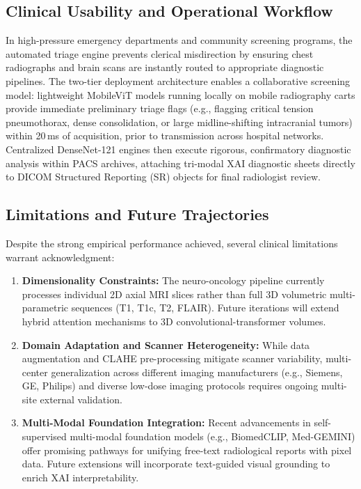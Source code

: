 \documentclass[journal]{IEEEtran}
\begin{document}
\subsection{Clinical Usability and Operational Workflow}
In high-pressure emergency departments and community screening programs, the automated triage engine prevents clerical misdirection by ensuring chest radiographs and brain scans are instantly routed to appropriate diagnostic pipelines. The two-tier deployment architecture enables a collaborative screening model: lightweight MobileViT models running locally on mobile radiography carts provide immediate preliminary triage flags (e.g., flagging critical tension pneumothorax, dense consolidation, or large midline-shifting intracranial tumors) within 20\,ms of acquisition, prior to transmission across hospital networks. Centralized DenseNet-121 engines then execute rigorous, confirmatory diagnostic analysis within PACS archives, attaching tri-modal XAI diagnostic sheets directly to DICOM Structured Reporting (SR) objects for final radiologist review.

\subsection{Limitations and Future Trajectories}
Despite the strong empirical performance achieved, several clinical limitations warrant acknowledgment:
\begin{enumerate}
    \item \textbf{Dimensionality Constraints:} The neuro-oncology pipeline currently processes individual 2D axial MRI slices rather than full 3D volumetric multi-parametric sequences (T1, T1c, T2, FLAIR). Future iterations will extend hybrid attention mechanisms to 3D convolutional-transformer volumes.
    \item \textbf{Domain Adaptation and Scanner Heterogeneity:} While data augmentation and CLAHE pre-processing mitigate scanner variability, multi-center generalization across different imaging manufacturers (e.g., Siemens, GE, Philips) and diverse low-dose imaging protocols requires ongoing multi-site external validation.
    \item \textbf{Multi-Modal Foundation Integration:} Recent advancements in self-supervised multi-modal foundation models (e.g., BiomedCLIP, Med-GEMINI) offer promising pathways for unifying free-text radiological reports with pixel data. Future extensions will incorporate text-guided visual grounding to enrich XAI interpretability.
\end{enumerate}
\end{document}
